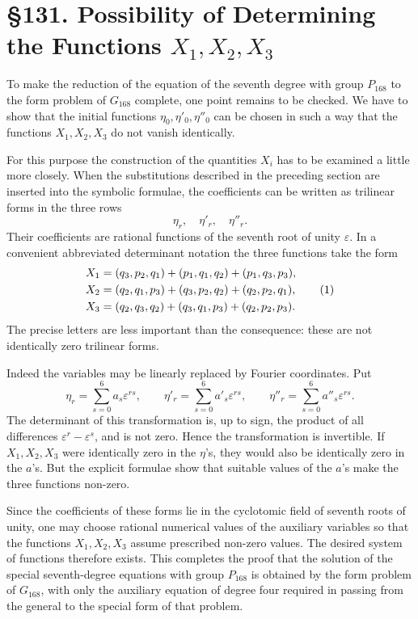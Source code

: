 \documentclass[11pt,a4paper]{book}
\newcommand{\webersection}[2]{\clearpage\section*{\S #1. #2}}
\newcommand{\eps}{\varepsilon}
\begin{document}
\webersection{131}{Possibility of Determining the Functions \(X_1,X_2,X_3\)}

To make the reduction of the equation of the seventh degree with group \(P_{168}\) to the form problem of \(G_{168}\) complete, one point remains to be checked.  We have to show that the initial functions \(\eta_0,\eta'_0,\eta''_0\) can be chosen in such a way that the functions \(X_1,X_2,X_3\) do not vanish identically.

For this purpose the construction of the quantities \(X_i\) has to be examined a little more closely.  When the substitutions described in the preceding section are inserted into the symbolic formulae, the coefficients can be written as trilinear forms in the three rows
\[
 \eta_r,
\quad \eta'_r,
\quad \eta''_r.
\]
Their coefficients are rational functions of the seventh root of unity \(\eps\).  In a convenient abbreviated determinant notation the three functions take the form
\begin{align}
 X_1&=(q_3,p_2,q_1)+(p_1,q_1,q_2)+(p_1,q_3,p_3),\notag\\
 X_2&=(q_2,q_1,p_3)+(q_3,p_2,q_2)+(q_2,p_2,q_1),\tag{1}\\
 X_3&=(q_2,q_3,q_2)+(q_3,q_1,p_3)+(q_2,p_2,p_3).\notag
\end{align}
The precise letters are less important than the consequence: these are not identically zero trilinear forms.

Indeed the variables may be linearly replaced by Fourier coordinates.  Put
\begin{equation}
 \eta_r=\sum_{s=0}^{6}a_s\eps^{rs},
 \qquad
 \eta'_r=\sum_{s=0}^{6}a'_s\eps^{rs},
 \qquad
 \eta''_r=\sum_{s=0}^{6}a''_s\eps^{rs}. \tag{2}
\end{equation}
The determinant of this transformation is, up to sign, the product of all differences \(\eps^r-\eps^s\), and is not zero.  Hence the transformation is invertible.  If \(X_1,X_2,X_3\) were identically zero in the \(\eta\)'s, they would also be identically zero in the \(a\)'s.  But the explicit formulae show that suitable values of the \(a\)'s make the three functions non-zero.

Since the coefficients of these forms lie in the cyclotomic field of seventh roots of unity, one may choose rational numerical values of the auxiliary variables so that the functions \(X_1,X_2,X_3\) assume prescribed non-zero values.  The desired system of functions therefore exists.  This completes the proof that the solution of the special seventh-degree equations with group \(P_{168}\) is obtained by the form problem of \(G_{168}\), with only the auxiliary equation of degree four required in passing from the general to the special form of that problem.
\end{document}
